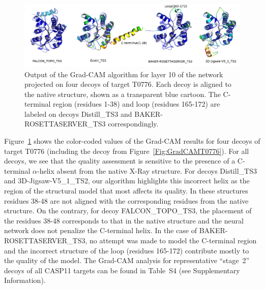 \documentclass{bioinfo}
\begin{document}
%
\begin{figure}[!tbp]
    \includegraphics[width=\linewidth]{image7.png}
    \caption{Output of the Grad-CAM algorithm for layer 10 of the
      network projected on four decoys of target T0776. Each decoy is
      aligned to the native structure, shown as a transparent blue
      cartoon. The C-terminal region (residues 1-38) and loop (residues 165-172) 
      are labeled on decoys Distill\_TS3 and BAKER-ROSETTASERVER\_TS3 correspondingly.}
%
    \label{Fig:GradCAMT0776_more}
\end{figure}
%
Figure~\ref{Fig:GradCAMT0776_more} shows the color-coded values of the
Grad-CAM results for four decoys of target T0776 (including the decoy
from Figure~\ref{Fig:GradCAMT0776}).  For all decoys, we see that the
quality assessment is sensitive to the presence of a C-terminal
$\alpha$-helix absent from the native X-Ray structure. For decoys
Distill\_TS3 and 3D-Jigsaw-V5\_1\_TS2, our algorithm highlights this
incorrect helix as the region of the structural model that most affects its
quality. In these structures residues 38-48 are not aligned with the
corresponding residues from the native structure.
%
On the contrary, for
decoy FALCON\_TOPO\_TS3, the placement of the residues 38-48
corresponds to that in the native structure and the neural network
does not penalize the C-terminal helix.
%
In the case of
BAKER-ROSETTASERVER\_TS3, no attempt was made to model the C-terminal
region and the incorrect structure of the loop (residues 165-172)
contribute mostly to the quality of the model.
%
The Grad-CAM analysis for representative ``stage~2''
decoys of all CASP11 targets can be found in Table~S4 (see
Supplementary Information).
\end{document}
